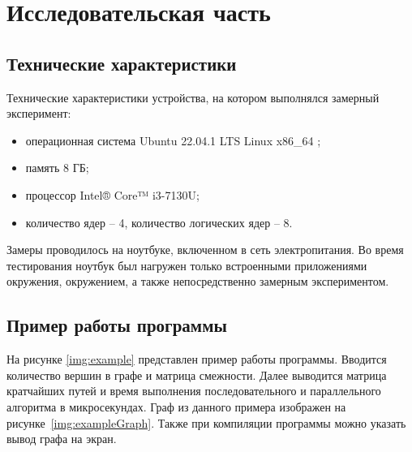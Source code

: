 \chapter{Исследовательская часть}

\section{Технические характеристики}

Технические характеристики устройства, на котором выполнялся замерный эксперимент:
\begin{itemize}[label*=---]
	\item операционная система Ubuntu 22.04.1 LTS Linux x86\_64 \cite{ubuntu};
	\item память 8 ГБ;
	\item процессор Intel® Core™ i3-7130U;
	\item количество ядер -- 4, количество логических ядер -- 8.
\end{itemize}

Замеры проводилось на ноутбуке, включенном в сеть электропитания. Во время тестирования ноутбук был нагружен только встроенными приложениями окружения, окружением, а также непосредственно замерным экспериментом.

\section{Пример работы программы}

На рисунке \ref{img:example} представлен пример работы программы. Вводится количество вершин в графе и матрица смежности. Далее выводится матрица кратчайших путей и время выполнения последовательного и параллельного алгоритма в микросекундах. Граф из данного примера изображен на рисунке~\ref{img:exampleGraph}. Также при компиляции программы можно указать вывод графа на экран.

